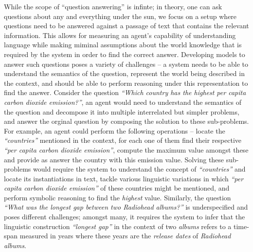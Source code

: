 \documentclass[main.tex]{subfiles}
\begin{document}
While the scope of ``question answering'' is infinte; in theory, one can ask questions about any and everything under the sun, we focus on a setup where questions need to be answered against a passage of text that contains the relevant information.  This allows for measuring an agent's capability of understanding language while making miminal assumptions about the world knowledge that is required by the system in order to find the correct answer.
Developing models to answer such questions poses a variety of challenges -- a system needs to be able to understand the semantics of the question, represent the world being described in the context, and should be able to perform reasoning under this representation to find the answer.
Consider the question \textit{``Which country has the highest per capita carbon dioxide emission?''}, an agent would need to understand the semantics of the question and decompose it into multiple interrelated but simpler problems, and answer the orginal question by composing the solution to these sub-problems.  For example, an agent could perform the following operations -- locate the \textit{``countries''} mentioned in the context, for each one of them find their respective \textit{``per capita carbon dioxide emission''}, compute the maximum value amongst these and provide as answer the country with this emission value.
Solving these sub-problems would require the system to understand the concept of \textit{``countries''} and locate its instantiations in text, tackle various linguistic variations in which \textit{``per capita carbon dioxide emission''} of these countries might be mentioned, and perform symbolic reasoning to find the \textit{highest} value.  Similarly, the question \textit{``What was the longest gap between two Radiohead albums?''} is underspecified and poses different challenges; amongst many, it requires the system to infer that the linguistic construction \textit{``longest gap''} in the context of two \textit{albums} refers to a time-span measured in years where these years are the \textit{release dates} of \textit{Radiohead albums}.
\end{document}
